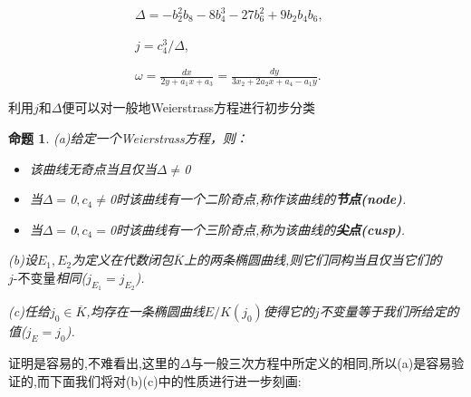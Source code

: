 \documentclass[11pt]{ctexart}
\newtheorem{pro}{命题}[section]
\begin{document}
~~~~~~~~~~~~~~~~~~~~$\Delta=-b_2^2b_8-8b_4^3-27b_6^2+9b_2b_4b_6$,

~~~~~~~~~~~~~~~~~~~~$j=c_4^3/\Delta$,

~~~~~~~~~~~~~~~~~~~~$\omega=\frac{dx}{2y+a_1x+a_3}=\frac{dy}{3x_2+2a_2x+a_4-a_1y}$.
   
\noindent 利用$j$和$\Delta$便可以对一般地Weierstrass方程进行初步分类

\begin{pro}(a)给定一个Weierstrass方程，则：
    \begin{itemize}
        \item 该曲线无奇点当且仅当$\Delta \neq $0
        \item 当$\Delta = $0$,c_4 \neq$0时该曲线有一个二阶奇点,称作该曲线的\textbf{节点(node)}.
        \item 当$\Delta = $0$,c_4 =$0时该曲线有一个三阶奇点,称为该曲线的\textbf{尖点(cusp)}.
    \end{itemize}

    (b)设$E_1$$,E_2$为定义在代数闭包$\overline{K}$上的两条椭圆曲线,则它们同构当且仅当它们的$\textbf{$j$-不变量}$相同($j_{E_1}=j_{E_2}$).

    (c)任给$j_0 \in \overline{K}$,均存在一条椭圆曲线$E/K(j_0)$使得它的$j$不变量等于我们所给定的值($j_E=j_0$).


\end{pro}

证明是容易的,不难看出,这里的$\Delta$与一般三次方程中所定义的相同,所以(a)是容易验证的,而下面我们将对(b)(c)中的性质进行进一步刻画:
\end{document}
